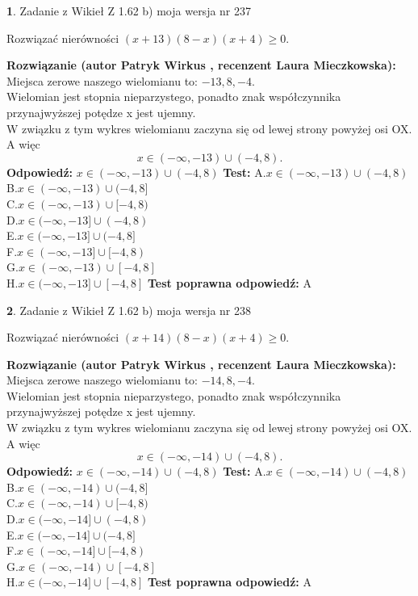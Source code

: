 \documentclass[12pt, a4paper]{article}
\theoremstyle{definition} %
\newtheorem{zad}{}
\newcommand{\zadStart}[1]{\begin{zad}#1\newline}
\newcommand{\zadStop}{\end{zad}}
\newcommand{\rozwStart}[2]{\noindent \textbf{Rozwiązanie (autor #1 , recenzent #2): }\newline}
\newcommand{\rozwStop}{\newline}
\newcommand{\odpStart}{\noindent \textbf{Odpowiedź:}\newline}
\newcommand{\odpStop}{\newline}
\newcommand{\testStart}{\noindent \textbf{Test:}\newline}
\newcommand{\testStop}{\newline}
\newcommand{\kluczStart}{\noindent \textbf{Test poprawna odpowiedź:}\newline}
\newcommand{\kluczStop}{\newline}
\begin{document}
\zadStart{Zadanie z Wikieł Z 1.62 b) moja wersja nr 237}

Rozwiązać nierówności $(x+13)(8-x)(x+4)\ge0$.
\zadStop
\rozwStart{Patryk Wirkus}{Laura Mieczkowska}
Miejsca zerowe naszego wielomianu to: $-13, 8, -4$.\\
Wielomian jest stopnia nieparzystego, ponadto znak współczynnika przy\linebreak najwyższej potędze x jest ujemny.\\ W związku z tym wykres wielomianu zaczyna się od lewej strony powyżej osi OX. A więc $$x \in (-\infty,-13) \cup (-4,8).$$
\rozwStop
\odpStart
$x \in (-\infty,-13) \cup (-4,8)$
\odpStop
\testStart
A.$x \in (-\infty,-13) \cup (-4,8)$\\
B.$x \in (-\infty,-13) \cup (-4,8]$\\
C.$x \in (-\infty,-13) \cup [-4,8)$\\
D.$x \in (-\infty,-13] \cup (-4,8)$\\
E.$x \in (-\infty,-13] \cup (-4,8]$\\
F.$x \in (-\infty,-13] \cup [-4,8)$\\
G.$x \in (-\infty,-13) \cup [-4,8]$\\
H.$x \in (-\infty,-13] \cup [-4,8]$
\testStop
\kluczStart
A
\kluczStop



\zadStart{Zadanie z Wikieł Z 1.62 b) moja wersja nr 238}

Rozwiązać nierówności $(x+14)(8-x)(x+4)\ge0$.
\zadStop
\rozwStart{Patryk Wirkus}{Laura Mieczkowska}
Miejsca zerowe naszego wielomianu to: $-14, 8, -4$.\\
Wielomian jest stopnia nieparzystego, ponadto znak współczynnika przy\linebreak najwyższej potędze x jest ujemny.\\ W związku z tym wykres wielomianu zaczyna się od lewej strony powyżej osi OX. A więc $$x \in (-\infty,-14) \cup (-4,8).$$
\rozwStop
\odpStart
$x \in (-\infty,-14) \cup (-4,8)$
\odpStop
\testStart
A.$x \in (-\infty,-14) \cup (-4,8)$\\
B.$x \in (-\infty,-14) \cup (-4,8]$\\
C.$x \in (-\infty,-14) \cup [-4,8)$\\
D.$x \in (-\infty,-14] \cup (-4,8)$\\
E.$x \in (-\infty,-14] \cup (-4,8]$\\
F.$x \in (-\infty,-14] \cup [-4,8)$\\
G.$x \in (-\infty,-14) \cup [-4,8]$\\
H.$x \in (-\infty,-14] \cup [-4,8]$
\testStop
\kluczStart
A
\kluczStop
\end{document}
